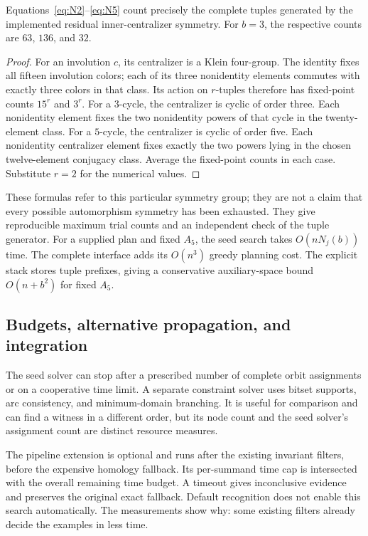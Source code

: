 \begin{proposition}
Equations~\eqref{eq:N2}--\eqref{eq:N5} count precisely the complete
tuples generated by the implemented residual inner-centralizer symmetry.
For $b=3$, the respective counts are $63$, $136$, and $32$.
\end{proposition}
\begin{proof}
For an involution $c$, its centralizer is a Klein four-group. The identity
fixes all fifteen involution colors; each of its three nonidentity
elements commutes with exactly three colors in that class. Its action on
$r$-tuples therefore has fixed-point counts $15^r$ and $3^r$.
For a $3$-cycle, the centralizer is cyclic of order three. Each
nonidentity element fixes the two nonidentity powers of that cycle in
the twenty-element class. For a $5$-cycle, the centralizer is cyclic of
order five. Each nonidentity centralizer element fixes exactly the two
powers lying in the chosen twelve-element conjugacy class. Average the
fixed-point counts in each case. Substitute $r=2$ for the numerical
values.
\end{proof}

These formulas refer to this particular symmetry group; they are not a
claim that every possible automorphism symmetry has been exhausted. They
give reproducible maximum trial counts and an independent check of the
tuple generator. For a supplied plan and fixed $A_5$, the seed search
takes $O(nN_j(b))$ time. The complete interface adds its $O(n^3)$ greedy
planning cost. The explicit stack stores tuple prefixes, giving a
conservative auxiliary-space bound $O(n+b^2)$ for fixed $A_5$.

\subsection{Budgets, alternative propagation, and integration}

The seed solver can stop after a prescribed number of complete orbit
assignments or on a cooperative time limit. A separate constraint solver
uses bitset supports, arc consistency, and minimum-domain branching. It
is useful for comparison and can find a witness in a different order,
but its node count and the seed solver's assignment count are distinct
resource measures.

The pipeline extension is optional and runs after the existing invariant
filters, before the expensive homology fallback. Its per-summand time cap
is intersected with the overall remaining time budget. A timeout gives
inconclusive evidence and preserves the original exact fallback. Default
recognition does not enable this search automatically. The measurements
show why: some existing filters already decide the examples in less time.

